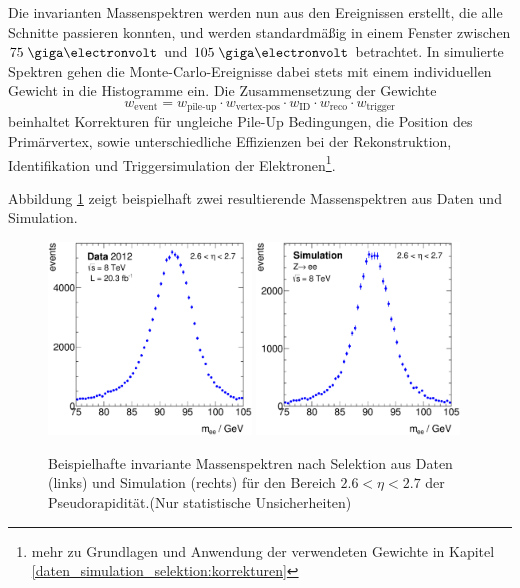 Die invarianten Massenspektren werden nun aus den Ereignissen erstellt, die
alle Schnitte passieren konnten, und werden standardmäßig in einem Fenster
zwischen $75 \GeV$ und $105 \GeV$ betrachtet. In simulierte Spektren gehen die
Monte-Carlo-Ereignisse dabei stets mit einem individuellen Gewicht in die
Histogramme ein. Die Zusammensetzung der Gewichte 
\begin{equation}
    w_\text{event} = w_\text{pile-up} \cdot w_\text{vertex-pos} \cdot
                     w_\text{ID} \cdot w_\text{reco} \cdot w_\text{trigger}
    \label{eq:calibration_weights}
\end{equation}
beinhaltet Korrekturen für ungleiche Pile-Up Bedingungen, die Position des
Primärvertex, sowie unterschiedliche Effizienzen bei der Rekonstruktion,
Identifikation und Triggersimulation der Elektronen\footnote{mehr zu Grundlagen
und Anwendung der verwendeten Gewichte in Kapitel
\ref{daten_simulation_selektion:korrekturen}}.

Abbildung \ref{fig:example_mee_p26} zeigt beispielhaft zwei resultierende
Massenspektren aus Daten und Simulation.

\begin{figure}
    \centering
    \includegraphics[width=0.48\textwidth]{plots/example_mee_data_p26}
    \hfill
    \includegraphics[width=0.48\textwidth]{plots/example_mee_mc_p26}
    \caption[Beispielhafte invariante Massenspektren nach Selektion aus Daten
        und Simulation für den Bereich $2.6 < \eta < 2.7$ der Pseudorapidität]
        {Beispielhafte invariante Massenspektren nach Selektion aus Daten
        (links) und Simulation (rechts) für den Bereich $2.6 < \eta < 2.7$ der
            Pseudorapidität.(Nur statistische Unsicherheiten)}
    \label{fig:example_mee_p26}
\end{figure}

